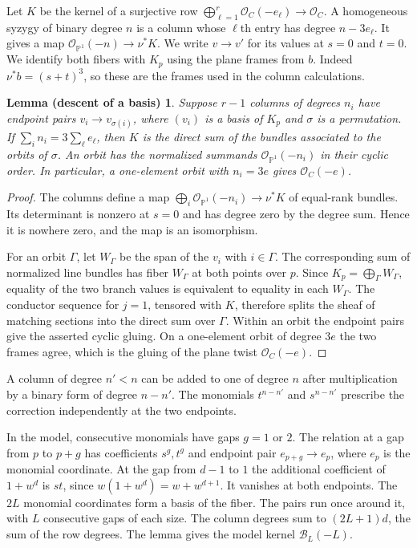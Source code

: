 \documentclass[11pt,a4paper,reqno]{amsart}
\numberwithin{equation}{section}
\theoremstyle{plain}
\newtheorem*{basislemma}{Lemma (descent of a basis)}
\newcommand{\OO}{\mathcal O}
\newcommand{\Bcal}{\mathcal B}
\begin{document}
Let $K$ be the kernel of a surjective row $\bigoplus_{\ell=1}^{r}\OO_C(-e_\ell)\to\OO_C$. A homogeneous syzygy of binary degree $n$ is a column whose $\ell$th entry has degree $n-3e_\ell$. It gives a map $\OO_{\mathbb P^1}(-n)\to\nu^*K$. We write $v\to v'$ for its values at $s=0$ and $t=0$. We identify both fibers with $K_p$ using the plane frames from $b$. Indeed $\nu^*b=(s+t)^3$, so these are the frames used in the column calculations.

\begin{basislemma}
Suppose $r-1$ columns of degrees $n_i$ have endpoint pairs $v_i\to v_{\sigma(i)}$, where $(v_i)$ is a basis of $K_p$ and $\sigma$ is a permutation. If $\sum_i n_i=3\sum_\ell e_\ell$, then $K$ is the direct sum of the bundles associated to the orbits of $\sigma$. An orbit has the normalized summands $\OO_{\mathbb P^1}(-n_i)$ in their cyclic order. In particular, a one-element orbit with $n_i=3e$ gives $\OO_C(-e)$.
\end{basislemma}
\begin{proof}
The columns define a map $\bigoplus_i\OO_{\mathbb P^1}(-n_i)\to\nu^*K$ of equal-rank bundles. Its determinant is nonzero at $s=0$ and has degree zero by the degree sum. Hence it is nowhere zero, and the map is an isomorphism.

For an orbit $\Gamma$, let $W_\Gamma$ be the span of the $v_i$ with $i\in\Gamma$. The corresponding sum of normalized line bundles has fiber $W_\Gamma$ at both points over $p$. Since $K_p=\bigoplus_\Gamma W_\Gamma$, equality of the two branch values is equivalent to equality in each $W_\Gamma$. The conductor sequence for $j=1$, tensored with $K$, therefore splits the sheaf of matching sections into the direct sum over $\Gamma$. Within an orbit the endpoint pairs give the asserted cyclic gluing. On a one-element orbit of degree $3e$ the two frames agree, which is the gluing of the plane twist $\OO_C(-e)$.
\end{proof}

A column of degree $n'<n$ can be added to one of degree $n$ after multiplication by a binary form of degree $n-n'$. The monomials $t^{n-n'}$ and $s^{n-n'}$ prescribe the correction independently at the two endpoints.

In the model, consecutive monomials have gaps $g=1$ or $2$. The relation at a gap from $p$ to $p+g$ has coefficients $s^g,t^g$ and endpoint pair $e_{p+g}\to e_p$, where $e_p$ is the monomial coordinate. At the gap from $d-1$ to $1$ the additional coefficient of $1+w^d$ is $st$, since $w(1+w^d)=w+w^{d+1}$. It vanishes at both endpoints. The $2L$ monomial coordinates form a basis of the fiber. The pairs run once around it, with $L$ consecutive gaps of each size. The column degrees sum to $(2L+1)d$, the sum of the row degrees. The lemma gives the model kernel $\Bcal_L(-L)$.
\end{document}
